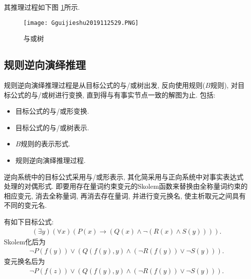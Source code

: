 其推理过程如下图 \ref{AI32fig2019120129}所示.
\begin{figure}[H]
\centering
\texttt{[image: Gguijieshu2019112529.PNG]}
\caption{与或树}
\label{AI32fig2019120129}
\end{figure}
\subsection{规则逆向演绎推理}
规则逆向演绎推理过程是从目标公式的与/或树出发, 反向使用规则($B$规则), 对目标公式的与/或树进行变换, 直到得与有事实节点一致的解图为止. 包括:
\begin{itemize}
\item 目标公式的与/或形变换.
\item 目标公式的与/或树表示.
\item $B$规则的表示形式.
\item 规则逆向演绎推理过程.
\end{itemize}

逆向系统中的目标公式采用与/或形表示, 其化简采用与正向系统中对事实表达式处理的对偶形式.
即要用存在量词约束变元的Skolem函数来替换由全称量词约束的相应变元, 消去全称量词, 再消去存在量词, 并进行变元换名, 使主析取元之间具有不同的变元名.
\begin{example}
有如下目标公式:
\begin{align}
  (\exists  y) (\forall x)(P(x)\rightarrow (Q(x)\wedge \neg (R(x)\wedge S(y)))).
\end{align}
Skolem化后为
\begin{align}
  \neg P(f(y))\vee (Q(f(y), y)\wedge (\neg R(f(y))\vee \neg S(y))).
\end{align}
变元换名后为
\begin{align}
  \neg P(f(z))\vee (Q(f(y), y)\wedge (\neg R(f(y))\vee \neg S(y))).
\end{align}
\end{example}

